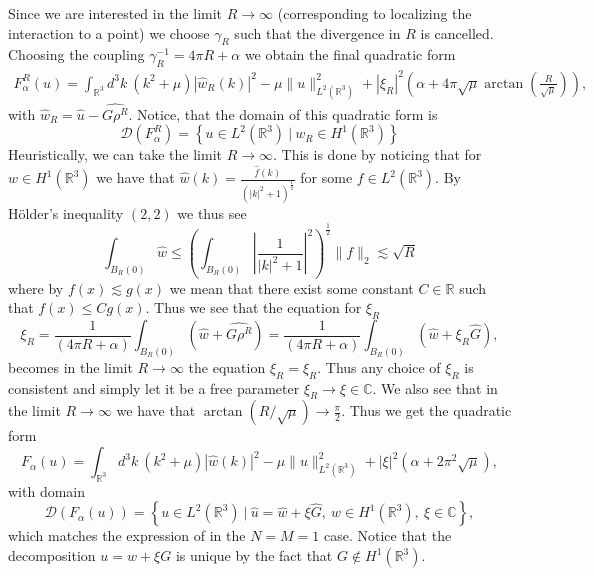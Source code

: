 \documentclass[a4paper,11pt]{article}
\newcommand{\dom}[1]{\mathscr D\left(#1\right)}
\newcommand{\R}{\mathbb{R}}
\newcommand{\C}{\mathbb{C}}
\numberwithin{equation}{section}
\begin{document}
Since we are interested in the limit $ R\to\infty $ (corresponding to localizing the interaction to a point) we choose $ \gamma_R $ such that the divergence in $ R $ is cancelled. Choosing the coupling $ \gamma_R^{-1}=4\pi R+\alpha $ we obtain the final quadratic form\begin{equation}
\begin{aligned}
F_\alpha^R(u)=\int_{\R^3} d^3k\ \left(k^2+\mu\right)|\hat{w}_R(k)|^2-\mu\|u\|^2_{L^2(\R^3)}+|\xi_R|^2\left(\alpha+4\pi\sqrt{\mu}\arctan\left(\frac{R}{\sqrt{\mu}}\right)\right),
\end{aligned}
\end{equation}
with $ \hat{w}_R=\hat{u}-\widehat{G\rho^R} $. Notice, that the domain of this quadratic form is \begin{equation}
\dom{F_\alpha^R}=\left\{u\in L^2(\R^3)\ |\ w_R\in H^1(\R^3) \right\}
\end{equation} Heuristically, we can take the limit $ R\to\infty $. This is done by noticing that for $ w\in H^1(\R^3) $ we have that $ \hat{w}(k)=\frac{\hat{f}(k)}{(|k|^2+1)^{\frac{1}{2}}} $ for some $ f\in L^2(\R^3) $. By H\"older's inequality $ (2,2) $ we thus see \begin{equation}
\int_{B_R(0)} \hat{w}\leq\left(\int_{B_R(0)}\left\lvert\frac{1}{|k|^2+1}\right\rvert^2 \right)^{\frac{1}{2}}\|f\|_2\lesssim\sqrt{R}
\end{equation}
where by $ f(x)\lesssim g(x)$ we mean that there exist some constant $ C\in\R $ such that $ f(x)\leq Cg(x) $. Thus we see that the equation for $ \xi_R $ \begin{equation}
\xi_R=\frac{1}{(4\pi R+\alpha)}\int_{B_R(0)}\left(\hat{w}+\widehat{G\rho^R}\right)=\frac{1}{(4\pi R+\alpha)}\int_{B_R(0)}\left(\hat{w}+\xi_R\hat{G}\right),
\end{equation} becomes in the limit $ R\to\infty $ the equation $ \xi_R=\xi_R $. Thus any choice of $ \xi_R $ is consistent and simply let it be a free parameter $ \xi_R\to\xi\in\C $. We also see that in the limit $ R\to\infty $ we have that $ \arctan\left(R/\sqrt{\mu}\right)\to\frac{\pi}{2} $. Thus we get the quadratic form\begin{equation}
F_\alpha(u)=\int_{\R^3} d^3k\ \left(k^2+\mu\right)|\hat{w}(k)|^2-\mu\|u\|^2_{L^2(\R^3)}+|\xi|^2\left(\alpha+2\pi^2\sqrt{\mu}\right),
\end{equation}
with domain\begin{equation}
\dom{F_\alpha(u)}=\left\{u\in L^2(\R^3) \ |\ \hat{u}=\hat{w}+\xi\hat{G},\ w\in H^1(\R^3),\ \xi\in\C \right\},
\end{equation}
which matches the expression of \cite{Moser_2017} in the $ N=M=1 $ case. Notice that the decomposition $ u=w+\xi G $ is unique by the fact that $ G\notin H^1(\R^3) $.
\end{document}

